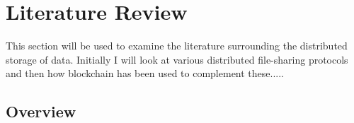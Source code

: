 
\chapter{Literature Review}

This section will be used to examine the literature surrounding the distributed storage of data. Initially I will look at various distributed file-sharing protocols and then how blockchain has been used to complement these.....



% 

\section{Overview}
